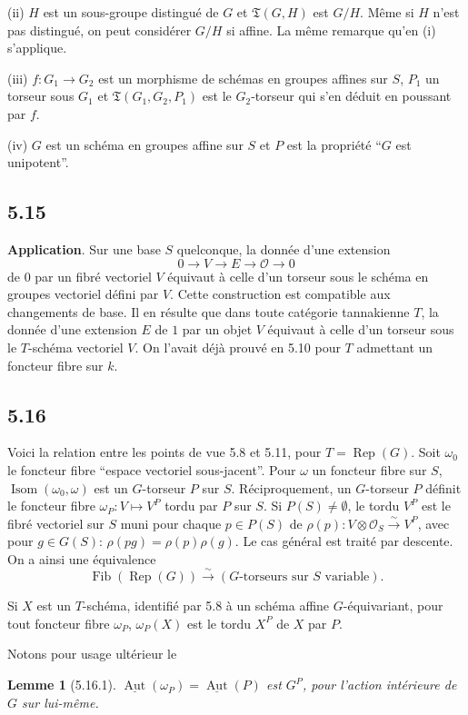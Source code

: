\documentclass[12pt,a4paper]{article}
\theoremstyle{plain}
\newtheorem{lemma}[theorem]{Lemme}
\theoremstyle{definition}
\theoremstyle{remark}
\DeclareMathOperator{\Aut}{Aut}
\DeclareMathOperator{\Rep}{Rep}
\DeclareMathOperator{\Isom}{Isom}
\DeclareMathOperator{\Fib}{Fib}
\begin{document}
(ii) $H$ est un sous-groupe distingué de $G$ et $\mathfrak{T}(G,H)$ est $G/H$. Même si $H$ n'est pas distingué, on peut considérer $G/H$ si affine. La même remarque qu'en (i) s'applique.

(iii) $f: G_1 
\to G_2$ est un morphisme de schémas en groupes affines sur $S$, $P_1$ un torseur sous $G_1$ et $\mathfrak{T}(G_1,G_2,P_1)$ est le $G_2$-torseur qui s'en déduit en poussant par $f$.

(iv) $G$ est un schéma en groupes affine sur $S$ et $P$ est la propriété ``$G$ est unipotent''.

\subsection*{5.15}
\textbf{Application}. Sur une base $S$ quelconque, la donnée d'une extension
\[
0 
\longrightarrow V 
\longrightarrow E 
\longrightarrow 
\mathcal{O} 
\longrightarrow 0
\]
de $0$ par un fibré vectoriel $V$ équivaut à celle d'un torseur sous le schéma en groupes vectoriel défini par $V$. Cette construction est compatible aux changements de base. Il en résulte que dans toute catégorie tannakienne $T$, la donnée d'une extension $E$ de $1$ par un objet $V$ équivaut à celle d'un torseur sous le $T$-schéma vectoriel $V$. On l'avait déjà prouvé en 5.10 pour $T$ admettant un foncteur fibre sur $k$.

\subsection*{5.16}
Voici la relation entre les points de vue 5.8 et 5.11, pour $T = 
\Rep(G)$. Soit $\omega_0$ le foncteur fibre ``espace vectoriel sous-jacent''. Pour $\omega$ un foncteur fibre sur $S$, $\Isom(\omega_0,\omega)$ est un $G$-torseur $P$ sur $S$. Réciproquement, un $G$-torseur $P$ définit le foncteur fibre $\omega_P: V 
\mapsto V^P$ tordu par $P$ sur $S$. Si $P(S) 
\neq 
\emptyset$, le tordu $V^P$ est le fibré vectoriel sur $S$ muni pour chaque $p 
\in P(S)$ de $\rho(p): V 
\otimes 
\mathcal{O}_S 
\xrightarrow{\sim} V^P$, avec pour $g 
\in G(S)$: $\rho(pg) = 
\rho(p)
\rho(g)$. Le cas général est traité par descente. On a ainsi une équivalence
\[
\Fib(\Rep(G)) 
\xrightarrow{\sim} (G\text{-torseurs sur } S \text{ variable}).
\]

Si $X$ est un $T$-schéma, identifié par 5.8 à un schéma affine $G$-équivariant, pour tout foncteur fibre $\omega_P$, $\omega_P(X)$ est le tordu $X^P$ de $X$ par $P$.

Notons pour usage ultérieur le
\begin{lemma}[5.16.1]\label{lem:5.16.1}
$\underline{\Aut}(\omega_P) = 
\underline{\Aut}(P)$ est $G^P$, pour l'action intérieure de $G$ sur lui-même.
\end{lemma}
\end{document}
